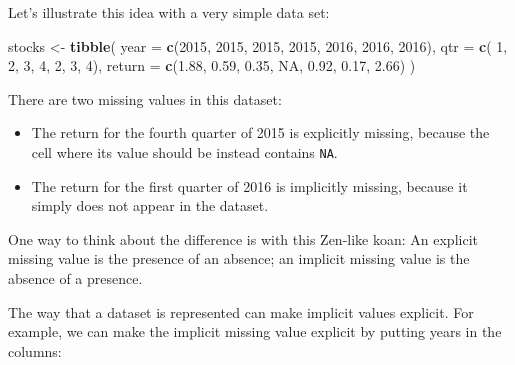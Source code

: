 \documentclass[]{book}
\newenvironment{Shaded}{\begin{snugshade}}{\end{snugshade}}
\newcommand{\KeywordTok}[1]{\textcolor[rgb]{0.13,0.29,0.53}{\textbf{{#1}}}}
\newcommand{\DataTypeTok}[1]{\textcolor[rgb]{0.13,0.29,0.53}{{#1}}}
\newcommand{\DecValTok}[1]{\textcolor[rgb]{0.00,0.00,0.81}{{#1}}}
\newcommand{\FloatTok}[1]{\textcolor[rgb]{0.00,0.00,0.81}{{#1}}}
\newcommand{\StringTok}[1]{\textcolor[rgb]{0.31,0.60,0.02}{{#1}}}
\newcommand{\CommentTok}[1]{\textcolor[rgb]{0.56,0.35,0.01}{\textit{{#1}}}}
\newcommand{\OtherTok}[1]{\textcolor[rgb]{0.56,0.35,0.01}{{#1}}}
\newcommand{\NormalTok}[1]{{#1}}
\begin{document}
Let's illustrate this idea with a very simple data set:

\begin{Shaded}
\begin{Highlighting}[]
\NormalTok{stocks <-}\StringTok{ }\KeywordTok{tibble}\NormalTok{(}
  \DataTypeTok{year   =} \KeywordTok{c}\NormalTok{(}\DecValTok{2015}\NormalTok{, }\DecValTok{2015}\NormalTok{, }\DecValTok{2015}\NormalTok{, }\DecValTok{2015}\NormalTok{, }\DecValTok{2016}\NormalTok{, }\DecValTok{2016}\NormalTok{, }\DecValTok{2016}\NormalTok{),}
  \DataTypeTok{qtr    =} \KeywordTok{c}\NormalTok{(   }\DecValTok{1}\NormalTok{,    }\DecValTok{2}\NormalTok{,    }\DecValTok{3}\NormalTok{,    }\DecValTok{4}\NormalTok{,    }\DecValTok{2}\NormalTok{,    }\DecValTok{3}\NormalTok{,    }\DecValTok{4}\NormalTok{),}
  \DataTypeTok{return =} \KeywordTok{c}\NormalTok{(}\FloatTok{1.88}\NormalTok{, }\FloatTok{0.59}\NormalTok{, }\FloatTok{0.35}\NormalTok{,   }\OtherTok{NA}\NormalTok{, }\FloatTok{0.92}\NormalTok{, }\FloatTok{0.17}\NormalTok{, }\FloatTok{2.66}\NormalTok{)}
\NormalTok{)}
\end{Highlighting}
\end{Shaded}

There are two missing values in this dataset:

\begin{itemize}
\item
  The return for the fourth quarter of 2015 is explicitly missing,
  because the cell where its value should be instead contains
  \texttt{NA}.
\item
  The return for the first quarter of 2016 is implicitly missing,
  because it simply does not appear in the dataset.
\end{itemize}

One way to think about the difference is with this Zen-like koan: An
explicit missing value is the presence of an absence; an implicit
missing value is the absence of a presence.

The way that a dataset is represented can make implicit values explicit.
For example, we can make the implicit missing value explicit by putting
years in the columns:

\begin{Shaded}
\end{Shaded}
\end{document}
